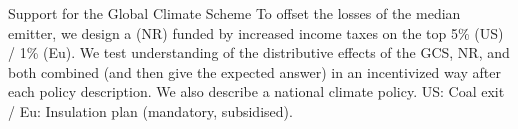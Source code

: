 \documentclass[aspectratio=169,xcolor=dvipsnames, 11pt,mathserif]{beamer}
\begin{document}
\begin{framefont}{\small}
\begin{frame}{Support for the Global Climate Scheme\label{gcs_support}}
    \bbvsp \ip To offset the losses of the median emitter, we design a  (NR) funded by increased income taxes on the top 5\% (US) / 1\% (Eu).
    \ip We test understanding of the distributive effects of the GCS, NR, and both combined (and then give the expected answer) in an incentivized way after each policy description. \hyperlink{understanding}{}
    \ip We also describe a national climate policy. US: Coal exit / Eu: Insulation plan (mandatory, subsidised).
    \ee \vspace{-.3cm}
        \begin{figure}
            \centering %
        \end{figure}
    \end{frame}


\end{framefont}
\end{document}
